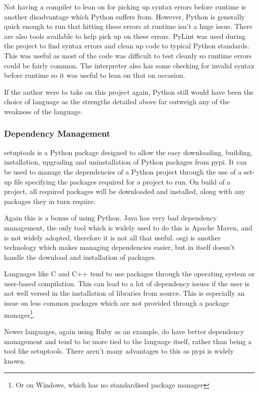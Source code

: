 Not having a compiler to lean on for picking up syntax errors before runtime is another
disadvantage which Python suffers from. However, Python is generally quick enough to run that 
hitting these errors at runtime isn't a huge issue. There are also tools available to help pick up
on these errors. PyLint was used during the project to find syntax errors and clean up code to
typical Python standards. This was useful as most of the code was difficult to test cleanly so
runtime errors could be fairly common. The interpreter also has some checking for invalid syntax 
before runtime so it was useful to lean on that on occasion.

If the author were to take on this project again, Python still would have been the choice of 
language as the strengths detailed above far outweigh any of the weakness of the language.

\subsubsection{Dependency Management}
setuptools is a Python package designed to allow the easy downloading, building, 
installation, upgrading and uninstallation of Python packages from \gls{pypi}. It can be used to
manage the dependencies of a Python project through the use of a set-up file specifying the 
packages required for a project to run. On build of a project, all required packages will be 
downloaded and installed, along with any packages they in turn require.

Again this is a bonus of using Python. Java has very bad dependency management, the only tool
which is widely used to do this is Apache Maven, and is not widely adopted, therefore it is not all
that useful. \Gls{osgi} is another technology which makes managing dependencies easier, but in 
itself doesn't handle the download and installation of packages.

Languages like C and C++ tend to use packages through the operating system or user-based 
compilation. This can lead to a lot of dependency issues if the user is not well versed in the
installation of libraries from source. This is especially an issue on less common packages which are not provided
through a package manager\footnote{Or on Windows, which has no standardised package manager}.

Newer languages, again using Ruby as an example, do have better dependency management and tend to
be more tied to the language itself, rather than being a tool like setuptools. There aren't
many advantages to this as \gls{pypi} is widely known.


